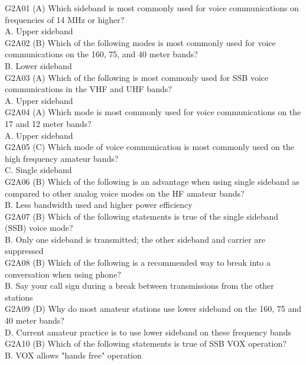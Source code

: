 \documentclass[12pt,letterpaper]{report}
\begin{document}
G2A01 (A) Which sideband is most commonly used for voice communications on frequencies of 14 MHz or higher?\\
A. Upper sideband\\

G2A02 (B) Which of the following modes is most commonly used for voice communications on the 160, 75, and 40 meter bands?\\
B. Lower sideband\\

G2A03 (A) Which of the following is most commonly used for SSB voice communications in the VHF and UHF bands?\\
A. Upper sideband\\

G2A04 (A) Which mode is most commonly used for voice communications on the 17 and 12 meter bands?\\
A. Upper sideband \\

G2A05 (C) Which mode of voice communication is most commonly used on the high frequency amateur bands? \\
C. Single sideband \\

G2A06 (B) Which of the following is an advantage when using single sideband as compared to other analog voice modes on the HF amateur bands?\\
B. Less bandwidth used and higher power efficiency \\

G2A07 (B) Which of the following statements is true of the single sideband (SSB) voice mode? \\
B. Only one sideband is transmitted; the other sideband and carrier are suppressed \\

G2A08 (B) Which of the following is a recommended way to break into a conversation when using phone?\\
B. Say your call sign during a break between transmissions from the other stations\\

G2A09 (D) Why do most amateur stations use lower sideband on the 160, 75 and 40 meter bands?\\
D. Current amateur practice is to use lower sideband on these frequency bands\\

G2A10 (B) Which of the following statements is true of SSB VOX operation?\\
B. VOX allows "hands free" operation\\
\end{document}

